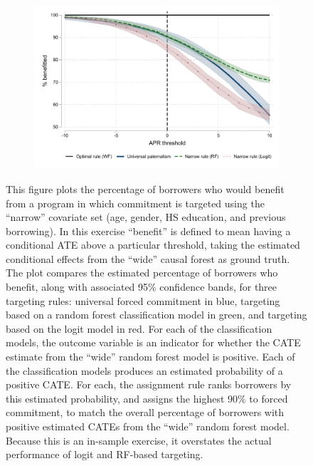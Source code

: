 \documentclass[oneside,11pt]{article}
\begin{document}
\begin{figure}[H]
    \caption{Targeting rules}
    \label{targeting_rules}
    \begin{center}
    \begin{subfigure}{0.75\textwidth}
        \centering
        \includegraphics[width=\textwidth]{Figuras/wide_narrow_rule.pdf}
    \end{subfigure}
    \end{center}
      \scriptsize   This figure plots the percentage of borrowers who would benefit from a program in which commitment is targeted using the ``narrow'' covariate set (age, gender, HS education, and previous borrowing). In this exercise ``benefit'' is defined to mean having a conditional ATE above a particular threshold, taking the estimated conditional effects from the ``wide'' causal forest as ground truth. The plot compares the estimated percentage of borrowers who benefit, along with associated 95\% confidence bands, for three targeting rules: universal forced commitment in blue, targeting based on a random forest classification model in green, and targeting based on the logit model in red. For each of the classification models, the outcome variable is an indicator for whether the CATE estimate from the ``wide'' random forest model is positive. Each of the classification models produces an estimated probability of a positive CATE. For each, the assignment rule ranks borrowers by this estimated probability, and assigns the highest 90\% to forced commitment, to match the overall percentage of borrowers with positive estimated CATEs from the ``wide'' random forest model. Because this is an in-sample exercise, it overstates the actual performance of logit and RF-based targeting. 


\end{figure}
\end{document}
